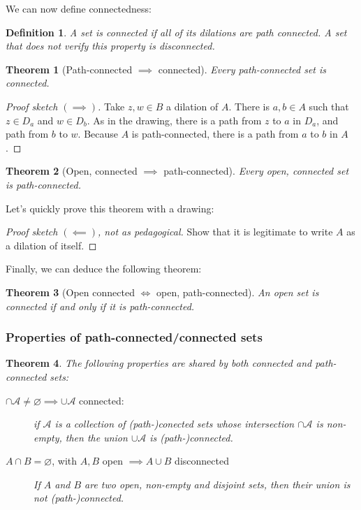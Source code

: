 \documentclass{article}
\newtheorem*{defi}{Definition}
\newtheorem*{thm*}{Theorem}
\let\emptyset\varnothing
\begin{document}
We can now define connectedness:

\begin{defi}
    A set is connected if all of its dilations are path connected. A set that does not verify this property is disconnected.
\end{defi}

\begin{thm*}[Path-connected $\implies$ connected]
    Every path-connected set is connected.
\end{thm*}

\begin{proof}[Proof sketch $(\implies)$]
    Take $z, w \in B$ a dilation of $A$. There is $a, b \in A$ such that $z\in D_a$ and $w\in D_b$.
    As in the drawing, there is a path from $z$ to $a$ in $D_a$, and path from $b$ to $w$. Because $A$ is path-connected, there is a path from $a$ to $b$ in $A$. 
\end{proof}

\begin{thm*}[Open, connected $\implies$ path-connected]
    Every open, connected set is path-connected.
\end{thm*}

Let's quickly prove this theorem with a drawing:

\begin{proof}[Proof sketch $(\impliedby)$, not as pedagogical]
    Show that it is legitimate to write $A$ as a dilation of itself.
\end{proof}

Finally, we can deduce the following theorem:

\begin{thm*}[Open connected $\iff$ open, path-connected]
   An open set is connected if and only if it is path-connected. 
\end{thm*}

\subsubsection{Properties of path-connected/connected sets}

\begin{thm*}
    The following properties are shared by both connected and path-connected sets:
    \begin{description}
        \item[$\cap \mathcal{A} \neq \emptyset \implies \cup \mathcal{A}$ connected: ] if $\mathcal{A}$ is a collection of (path-)conected sets whose intersection $\cap \mathcal{A}$ is non-empty, then the union $\cup \mathcal{A}$ is (path-)connected.
        \item[$A \cap B = \emptyset$, with $A,B$ open $ \implies A\cup B$ disconnected] If $A$ and $B$ are two open, non-empty and disjoint sets, then their union is not (path-)connected.
    \end{description}
\end{thm*}
\end{document}
